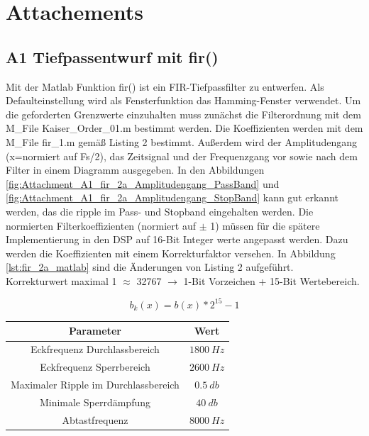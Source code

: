 \section{Attachements}

\subsection{A1 Tiefpassentwurf mit fir()}
\label{cap:A1}
Mit der Matlab Funktion fir() ist ein FIR-Tiefpassfilter zu entwerfen. Als Defaulteinstellung wird als Fensterfunktion das Hamming-Fenster verwendet. Um die geforderten Grenzwerte einzuhalten muss zunächst die Filterordnung mit dem M\_File Kaiser\_Order\_01.m bestimmt werden. Die Koeffizienten werden mit dem M\_File fir\_1.m gemäß Listing 2 bestimmt. Außerdem wird der Amplitudengang (x=normiert auf Fs/2), das Zeitsignal und der Frequenzgang vor sowie nach dem Filter in einem Diagramm ausgegeben. In den Abbildungen \ref{fig:Attachment_A1_fir_2a_Amplitudengang_PassBand} und \ref{fig:Attachment_A1_fir_2a_Amplitudengang_StopBand} kann gut erkannt werden, das die ripple im Pass- und Stopband eingehalten werden. Die normierten Filterkoeffizienten (normiert auf $\pm$ 1) müssen für die spätere Implementierung in den DSP auf 16-Bit Integer werte angepasst werden. Dazu werden die Koeffizienten mit einem Korrekturfaktor versehen. In Abbildung \ref{lst:fir_2a_matlab} sind die Änderungen von Listing 2 aufgeführt.\\Korrekturwert maximal 1 $\approx$ 32767 $\rightarrow$ 1-Bit Vorzeichen + 15-Bit Wertebereich. 

\begin{equation}
b_{k}(x) = b(x) * 2^{15}-1
\end{equation}

\begin{table}[h]
	\centering
	\begin{tabular}{c | c}
		Parameter	& Wert	\\
		\hline
		Eckfrequenz Durchlassbereich			& $1800~Hz$	\\
		Eckfrequenz Sperrbereich				& $2600~Hz$	\\
		Maximaler Ripple im Durchlassbereich	& $0.5~db$	\\
		Minimale Sperrdämpfung					& $40~db$	\\
		Abtastfrequenz							& $8000~Hz$	\\
	\end{tabular}
\end{table}





